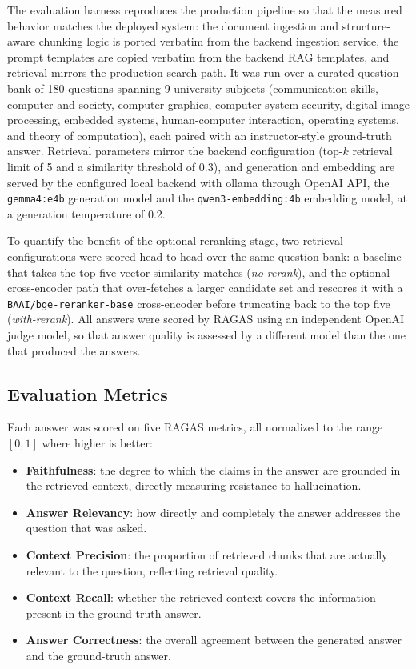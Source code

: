 \documentclass[12pt, a4paper, oneside]{report}
\let\oldsubsection\subsection
\renewcommand{\subsection}{%
  \addtocontents{toc}{\protect\needspace{3\baselineskip}}%
  \oldsubsection
}
\begin{document}
The evaluation harness reproduces the production pipeline so that the measured behavior matches the deployed system: the document ingestion and structure-aware chunking logic is ported verbatim from the backend ingestion service, the prompt templates are copied verbatim from the backend RAG templates, and retrieval mirrors the production search path. It was run over a curated question bank of 180 questions spanning 9 university subjects (communication skills, computer and society, computer graphics, computer system security, digital image processing, embedded systems, human-computer interaction, operating systems, and theory of computation), each paired with an instructor-style ground-truth answer. Retrieval parameters mirror the backend configuration (top-$k$ retrieval limit of 5 and a similarity threshold of 0.3), and generation and embedding are served by the configured local backend with ollama through OpenAI API, the \texttt{gemma4:e4b} generation model and the \texttt{qwen3-embedding:4b} embedding model, at a generation temperature of 0.2.

To quantify the benefit of the optional reranking stage, two retrieval configurations were scored head-to-head over the same question bank: a baseline that takes the top five vector-similarity matches (\textit{no-rerank}), and the optional cross-encoder path that over-fetches a larger candidate set and rescores it with a \texttt{BAAI/bge-reranker-base} cross-encoder before truncating back to the top five (\textit{with-rerank}). All answers were scored by RAGAS using an independent OpenAI judge model, so that answer quality is assessed by a different model than the one that produced the answers.

\newpage

\subsection{Evaluation Metrics}

Each answer was scored on five RAGAS metrics, all normalized to the range $[0, 1]$ where higher is better:

\begin{itemize}
  \item \textbf{Faithfulness}: the degree to which the claims in the answer are grounded in the retrieved context, directly measuring resistance to hallucination.
  \item \textbf{Answer Relevancy}: how directly and completely the answer addresses the question that was asked.
  \item \textbf{Context Precision}: the proportion of retrieved chunks that are actually relevant to the question, reflecting retrieval quality.
  \item \textbf{Context Recall}: whether the retrieved context covers the information present in the ground-truth answer.
  \item \textbf{Answer Correctness}: the overall agreement between the generated answer and the ground-truth answer.
\end{itemize}
\end{document}
